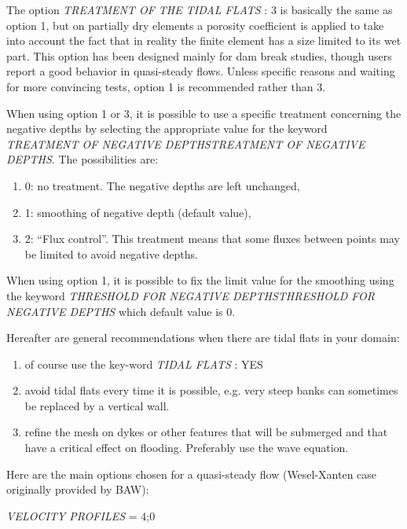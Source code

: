\documentclass{article} %
\begin{document}
 The option \textit{TREATMENT OF THE TIDAL FLATS} : 3 is basically the same as option 1, but on partially dry elements a porosity coefficient is applied to take into account the fact that in reality the finite element has a size limited to its wet part. This option has been designed mainly for dam break studies, though users report a good behavior in quasi-steady flows. Unless specific reasons and waiting for more convincing tests, option 1 is recommended rather than 3.

 When using option 1 or 3, it is possible to use a specific treatment concerning the negative depths by selecting the appropriate value for the keyword \textit{TREATMENT OF NEGATIVE DEPTHSTREATMENT OF NEGATIVE DEPTHS}. The possibilities are:

\begin{enumerate}
\item  0: no treatment. The negative depths are left unchanged,

\item  1: smoothing of negative depth (default value),

\item  2: ``Flux control''. This treatment means that some fluxes between points may be limited to avoid negative depths.
\end{enumerate}

 When using option 1, it is possible to fix the limit value for the smoothing using the keyword \textit{THRESHOLD FOR NEGATIVE DEPTHSTHRESHOLD FOR NEGATIVE DEPTHS} which default value is 0.

 Hereafter are general recommendations when there are tidal flats in your domain:

\begin{enumerate}
\item  of course use the key-word \textit{TIDAL FLATS }: YES

\item  avoid tidal flats every time it is possible, e.g. very steep banks can sometimes be replaced by a vertical wall.

\item  refine the mesh on dykes or other features that will be submerged and that have a critical effect on flooding. Preferably use the wave equation.
\end{enumerate}

 Here are the main options chosen for a quasi-steady flow (Wesel-Xanten case originally provided by BAW):

 \textit{VELOCITY PROFILES} = 4;0
\end{document}
